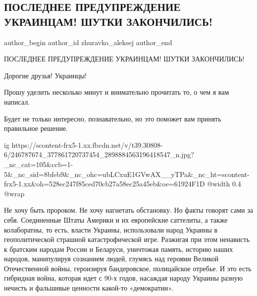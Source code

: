 
 
 
 
 
 
\subsection{ПОСЛЕДНЕЕ ПРЕДУПРЕЖДЕНИЕ УКРАИНЦАМ! ШУТКИ ЗАКОНЧИЛИСЬ!}
\label{sec:23_10_2021.fb.zhuravko_aleksej.1.poslednee_preduprezhdenie}
 
\ifcmt
 author_begin
   author_id zhuravko_aleksej
 author_end
\fi

ПОСЛЕДНЕЕ ПРЕДУПРЕЖДЕНИЕ УКРАИНЦАМ! ШУТКИ ЗАКОНЧИЛИСЬ!

Дорогие друзья! Украинцы!

Прошу уделить несколько минут и внимательно прочитать то, о чем я вам написал.

Будет не только интересно, познавательно, но это поможет вам принять правильное
решение.

\ifcmt
  ig https://scontent-frx5-1.xx.fbcdn.net/v/t39.30808-6/246787674_377861720737454_2898884563196418547_n.jpg?_nc_cat=105&ccb=1-5&_nc_sid=8bfeb9&_nc_ohc=ubLCxuE1GVwAX__yTPa&_nc_ht=scontent-frx5-1.xx&oh=528ec247f85ced70cb27a58ec25a45eb&oe=61924F1D
  @width 0.4
  @wrap 
\fi

Не хочу быть пророком. Не хочу нагнетать обстановку. Но факты говорят сами за
себя. Соединенные Штаты Америки и их европейские саттелиты, а также
колаборатны, то есть, власти Украины, использовали народ Украины в
геополитической страшной катастрофической игре. Разжигая при этом ненависть к
братским народам России и Беларуси, уничтожая память, историю наших народов,
манипулируя сознанием людей, глумясь над героями Великой Отечественной войны,
героизируя бандеровское, полицайское отребье. И это есть гибридная война,
которая идет с 90-х годов, насаждая народу Украины разную нечисть и фальшивые
ценности какой-то «демократии».

